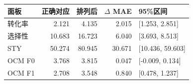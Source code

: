 \begin{tabular}{lrrrl}\toprule
面板 & 正确对应 & 排列后 & $\Delta$ MAE & 95\%区间 \\ \midrule
转化率 & 2.121 & 4.135 & 2.015 & [1.253, 2.851] \\
选择性 & 10.683 & 16.723 & 6.040 & [3.693, 8.513] \\
STY & 50.274 & 80.945 & 30.671 & [10.436, 59.603] \\
OCM F0 & 3.768 & 3.815 & 0.047 & [-0.009, 0.134] \\
OCM F1 & 2.708 & 3.548 & 0.840 & [0.478, 1.237] \\
\bottomrule\end{tabular}
